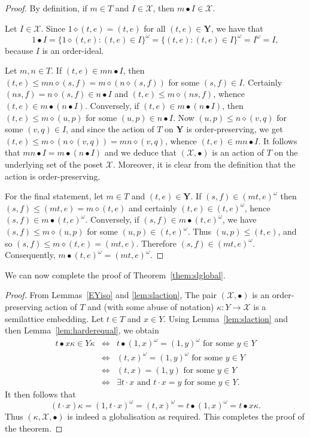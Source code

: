 \documentclass[12pt]{amsart}
\theoremstyle{definition}
\theoremstyle{definition}
\numberwithin{them}{section}
\numberwithin{equation}{section}
\begin{document}
\begin{proof} By definition,  if $m\in T$ and $I\in\mathcal{X}$, then $m\bullet I\in\mathcal{X}$. 


Let $I\in\mathcal{X}$. Since $1 \diamond (t,e)= (t,e)$ for all $(t,e)\in \mathbf{Y}$,  we have that
\[1\bullet I = \{ 1  \diamond (t,e): (t,e) \in I\}^\omega = 
 \{ (t,e): (t,e) \in I\}^\omega= I^\omega=I,\] 
because $I$ is an order-ideal.

Let $m,n\in T$. If
$(t,e)\in mn\bullet I$, then $(t,e)\leq mn\diamond (s,f)=m\diamond(n\diamond (s,f))$ for 
some $(s,f)\in I$. Certainly $(ns,f)=n\diamond (s,f)\in n\bullet I$ and $(t,e)\leq m\diamond (ns,f)$, whence
$(t,e)\in m \bullet (n\bullet I)$. Conversely, if
$(t,e)\in m \bullet (n\bullet I)$, then $(t,e)\leq m\diamond (u,p)$ for some $(u,p)\in n\bullet I$. Now 
$(u,p)\leq n\diamond (v,q)$ for some $(v,q)\in I$, and  
since the action of $T$ on $\mathbf{Y}$ is order-preserving, we get $(t,e)\leq m\diamond (n\diamond (v,q))=mn\diamond (v,q)$, whence $(t,e)\in mn\bullet I$. It follows that
$mn\bullet I=m \bullet (n\bullet I)$ and we deduce that  $(\mathcal{X}, \bullet)$ is an action of $T$ on  the underlying set of the poset $\mathcal{X}$.  
Moreover, it  is clear from the definition that  the action is order-preserving.

For the final statement, let   $m\in T$ and $(t,e)\in \mathbf{Y}$.  If
 $(s,f)\in (mt,e)^\omega$  then
 $(s,f)\leq (mt,e)=m\diamond (t,e)$ and certainly
 $(t,e)\in (t,e)^\omega$, hence $(s,f)\in m\bullet (t,e)^\omega$. Conversely, if
 $(s,f)\in m\bullet (t,e)^\omega$, we have 
$(s,f)\leq m\diamond (u,p)$ for some $(u,p)\in (t,e)^\omega$. Thus
$(u,p)\leq (t,e)$, and so
$(s,f)\leq m\diamond (t,e)=(mt,e)$. Therefore  $(s,f)\in (mt,e)^\omega$. Consequently, 
$m\bullet (t,e)^\omega = (mt,e)^\omega$. 
\end{proof}


We can now complete the proof of Theorem~\ref{them:slglobal}. 

\begin{proof} 
From Lemmas~\ref{EYiso} and \ref{lem:slaction},  The pair 
  $(\mathcal{X},\bullet)$ is an order-preserving action of $T$ and  (with some abuse of notation) $\kappa:Y\rightarrow \mathcal{X}$ is a semilattice embedding. 
Let $t\in T$ and $x\in Y$. Using Lemma~\ref{lem:slaction} 
and then Lemma~\ref{lem:harderequal},  we obtain
\[\begin{array}{rcl}
t\bullet x\kappa\in Y\kappa&\Leftrightarrow&
t\bullet (1,x)^\omega=(1,y)^\omega\mbox{ for some }y\in Y\\
&\Leftrightarrow&(t,x)^\omega=(1,y)^\omega\mbox{ for some }y\in Y\\
&\Leftrightarrow&(t,x)=(1,y)\mbox{ for some }y\in Y\\
&\Leftrightarrow& \exists t\cdot x\mbox{ and }t\cdot x=y \mbox{ for some }y\in Y.
    \end{array}\]
    It then follows that 
    \[(t\cdot x)\kappa=(1, t\cdot x)^\omega=(t,x)^\omega=t\bullet (1,x)^\omega=t\bullet x\kappa.\]
  Thus $(\kappa,\mathcal{X}, \bullet)$ is indeed a globalisation as required.  This completes the proof of the theorem.
 \end{proof}
\end{document}
